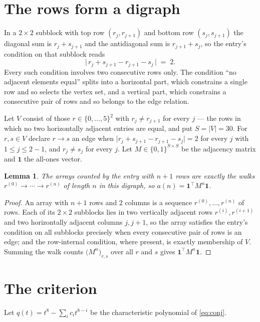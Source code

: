 \documentclass[11pt,a4paper]{article}
\theoremstyle{plain}
\newtheorem{lemma}[theorem]{Lemma}
\theoremstyle{definition}
\begin{document}
\section{The rows form a digraph}

In a $2\times2$ subblock with top row $(r_j,r_{j+1})$ and bottom row $(s_j,s_{j+1})$ the
diagonal sum is $r_j+s_{j+1}$ and the antidiagonal sum is $r_{j+1}+s_j$, so the entry's
condition on that subblock reads
\[
\bigl|\,r_j+s_{j+1}-r_{j+1}-s_j\,\bigr|\;=\;2.
\]
Every such condition involves two consecutive rows only. The condition ``no adjacent elements equal'' splits into a horizontal
part, which constrains a single row and so selects the vertex set, and a vertical part,
which constrains a consecutive pair of rows and so belongs to the edge relation.

Let $V$ consist of those $r\in\{0,\dots,5\}^{2}$ with $r_j\ne r_{j+1}$ for every
$j$ --- the rows in which no two horizontally adjacent entries are equal, and put $S=|V|=30$. For $r,s\in V$ declare $r\to s$ an edge
when $\bigl|r_j+s_{j+1}-r_{j+1}-s_j\bigr|=2$ for every $j$ with
$1\le j\le2-1$, and $r_j\ne s_j$ for every $j$. Let $M\in\{0,1\}^{S\times S}$ be the adjacency matrix and $\mathbf{1}$
the all-ones vector.

\begin{lemma}\label{lem:walk}
The arrays counted by the entry with $n+1$ rows are exactly the walks
$r^{(0)}\to\cdots\to r^{(n)}$ of length $n$ in this digraph, so
$a(n)=\mathbf{1}^{\!\top}M^{n}\mathbf{1}$.
\end{lemma}

\begin{proof}
An array with $n+1$ rows and $2$ columns is a sequence $r^{(0)},\dots,r^{(n)}$ of
rows. Each of its $2\times2$ subblocks lies in two vertically adjacent rows
$r^{(i)},r^{(i+1)}$ and two horizontally adjacent columns $j,j+1$, so the array satisfies
the entry's condition on all subblocks precisely when every consecutive pair of rows is an
edge; and the row-internal condition, where present, is exactly membership of $V$. Summing
the walk counts $\bigl(M^{n}\bigr)_{r,s}$ over all $r$ and $s$ gives
$\mathbf{1}^{\!\top}M^{n}\mathbf{1}$.
\end{proof}

\section{The criterion}

Let $q(t)=t^{8}-\sum_i c_i t^{8-i}$ be the characteristic polynomial of
\eqref{eq:conj}.
\end{document}
